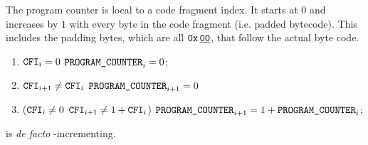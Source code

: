 The program counter \romColumnProgramCounter{} is local to a code fragment index.
It starts at $0$ and increases by $1$ with every byte in the code fragment (i.e. padded bytecode).
This includes the padding bytes, which are all $\texttt{0x\,}\underline{\texttt{00}}$, that follow the actual byte code.
\begin{enumerate}
    \item \If $\texttt{CFI} _{i} = 0$ \Then $\texttt{PROGRAM\_COUNTER} _{i} = 0$;
    \item \If $\texttt{CFI} _{i + 1} \neq \texttt{CFI} _{i}$ \Then $\texttt{PROGRAM\_COUNTER} _{i + 1} = 0$
    \item \If \Big($\texttt{CFI} _{i} \neq 0$ \et $\texttt{CFI} _{i + 1} \neq 1 + \texttt{CFI} _{i}$\Big) \Then $\texttt{PROGRAM\_COUNTER} _{i + 1} = 1 + \texttt{PROGRAM\_COUNTER} _{i}$;
\end{enumerate}
\saNote{}
\romColumnProgramCounter{} is \emph{de facto} \romColumnCfi{}-incrementing.
